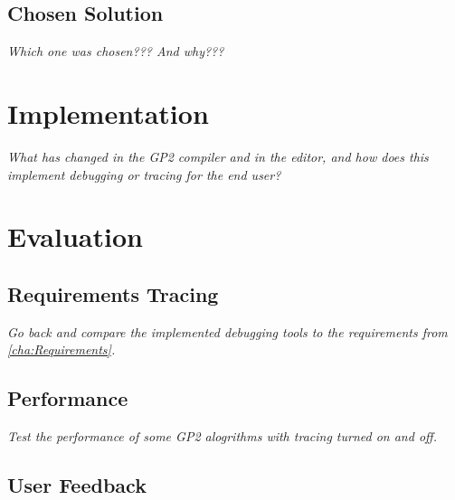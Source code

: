 \documentclass[authoryearcitations]{UoYCSproject}
\begin{document}

\section{Chosen Solution}
\label{sec:ChosenSolution}

\emph{Which one was chosen??? And why???}

\clearpage


\chapter{Implementation}
\label{cha:Implementation}

\emph{What has changed in the GP2 compiler and in the editor, and how does this
implement debugging or tracing for the end user?}

\clearpage


\chapter{Evaluation}
\label{cha:Evaluation}

\section{Requirements Tracing}
\label{sec:RequirementsTracing}

\emph{Go back and compare the implemented debugging tools to the requirements
from \autoref{cha:Requirements}.}


\section{Performance}
\label{sec:Performance}

\emph{Test the performance of some GP2 alogrithms with tracing turned on and off.}


\section{User Feedback}
\label{sec:UserFeedback}
\end{document}

